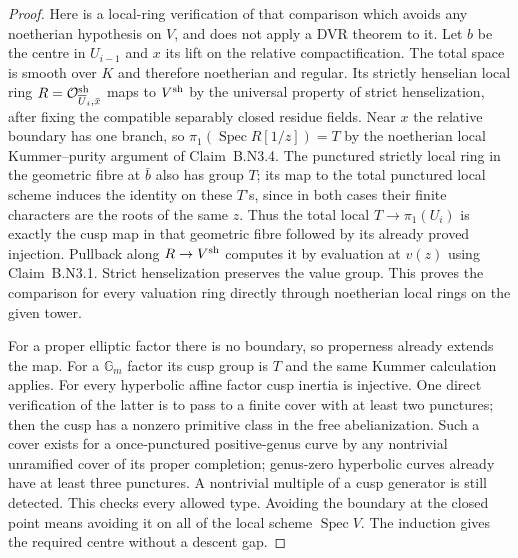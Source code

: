 \begin{proof}
Here is a local-ring verification of that comparison which avoids
any noetherian hypothesis on $V$, and does not apply a DVR theorem
to it.  Let $b$ be the centre in $U_{i-1}$ and $x$ its lift on the
relative compactification.  The total space is smooth over $K$ and
therefore noetherian and regular.  Its strictly henselian local ring
$R=\mathcal O^{\rm sh}_{\overline U_i,\bar x}$ maps to
$V^{\rm sh}$ by the universal property of strict henselization,
after fixing the compatible separably closed residue fields.  Near
$x$ the relative boundary has one branch, so
$\pi_1(\operatorname{Spec}R[1/z])=T$ by the noetherian local
Kummer--purity argument of Claim~B.N3.4.  The punctured strictly
local ring in the geometric fibre at $\bar b$ also has group $T$;
its map to the total punctured local scheme induces the identity on
these $T$'s, since in both cases their finite characters are the
roots of the same $z$.  Thus the total local $T\to\pi_1(U_i)$
is exactly the cusp map in that geometric fibre followed by its
already proved injection.  Pullback along $R\to V^{\rm sh}$
computes it by evaluation at $v(z)$ using Claim~B.N3.1.
Strict henselization preserves the value group.  This proves the
comparison for every valuation ring directly through noetherian
local rings on the given tower.

For a proper elliptic factor there is no boundary, so properness
already extends the map.  For a $\mathbb G_m$ factor its cusp group
is $T$ and the same Kummer calculation applies.  For every hyperbolic
affine factor cusp inertia is injective.  One direct verification of
the latter is to pass to a finite cover with at least two punctures;
then the cusp has a nonzero primitive class in the free abelianization.
Such a cover exists for a once-punctured positive-genus curve by any
nontrivial unramified cover of its proper completion; genus-zero
hyperbolic curves already have at least three punctures.  A
nontrivial multiple of a cusp generator is still detected.  This
checks every allowed type.  Avoiding the boundary at the closed
point means avoiding it on all of the local scheme $\operatorname{Spec}V$.
The induction gives the required centre without a descent gap.
\end{proof}

